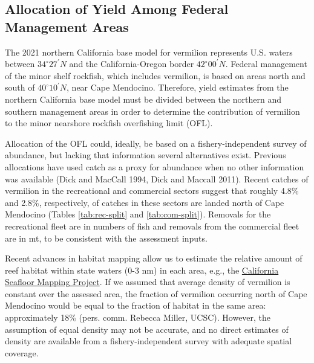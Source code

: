 \documentclass[
  english,
  a4paper,
]{article}
\begin{document}
\hypertarget{allocation-of-yield-among-federal-management-areas-1}{%
\subsection{Allocation of Yield Among Federal Management Areas}\label{allocation-of-yield-among-federal-management-areas-1}}

The 2021 northern California base model for vermilion represents U.S.
waters between $34^\circ 27^\prime N$ and the California-Oregon border $42^\circ 00^\prime N$. Federal management of
the minor shelf rockfish, which includes vermilion, is based on areas north and south of $40^\circ 10^\prime N$,
near Cape Mendocino. Therefore, yield estimates from the northern California base
model must be divided between the northern and southern management areas in order
to determine the contribution of vermilion to the minor nearshore rockfish overfishing limit (OFL).

Allocation of the OFL could, ideally, be based on a fishery-independent survey of
abundance, but lacking that information several alternatives exist. Previous
allocations have used catch as a proxy for abundance when no other information
was available (Dick and MacCall 1994, Dick and Maccall 2011). Recent catches of vermilion in the recreational
and commercial sectors suggest that roughly 4.8\% and 2.8\%, respectively, of catches
in these sectors are landed north of Cape Mendocino (Tables \ref{tab:rec-split} and \ref{tab:com-split}). Removals for the recreational fleet are in numbers of fish and removals
from the commercial fleet are in mt, to be consistent with the assessment inputs.

Recent advances in habitat mapping allow us to estimate the relative amount of reef
habitat within state waters (0-3 nm) in each area, e.g., the \href{https://walrus.wr.usgs.gov/mapping/csmp/}{California Seafloor Mapping Project}.
If we assumed that average density of vermilion is constant over the assessed area,
the fraction of vermilion occurring north of Cape Mendocino would be equal to the
fraction of habitat in the same area: approximately 18\% (pers. comm. Rebecca Miller, UCSC). However, the assumption of equal density may not be accurate, and no direct estimates of
density are available from a fishery-independent survey with adequate spatial coverage.
\end{document}
